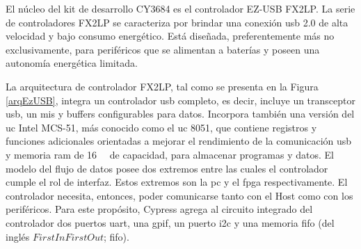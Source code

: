 El núcleo del kit de desarrollo CY3684 es el controlador EZ-USB FX2LP. La serie de controladores FX2LP se caracteriza por brindar una conexión \acrshort{usb} 2.0 de alta velocidad y bajo consumo energético. Está diseñada, preferentemente más no exclusivamente, para periféricos que se alimentan a baterías y poseen una autonomía energética limitada.

La arquitectura de controlador FX2LP, tal como se presenta en la Figura \ref{arqEzUSB}, integra un controlador \acrshort{usb} completo, es decir, incluye un transceptor \acrshort{usb}, un \acrfull{mis} y buffers configurables para datos. Incorpora también una versión del \acrfull{uc} Intel MCS-51, más conocido como el \acrshort{uc} 8051, que contiene registros y funciones adicionales orientadas a mejorar el rendimiento de la comunicación \acrshort{usb} y memoria \acrshort{ram} de \SI{16}{\kilo\byte} de capacidad, para almacenar programas y datos. 
El modelo del flujo de datos posee dos extremos entre las cuales el controlador cumple el rol de interfaz. Estos extremos son la \acrshort{pc} y el \acrshort{fpga} respectivamente. El controlador necesita, entonces, poder comunicarse tanto con el Host como con los periféricos. Para este propósito, Cypress agrega al circuito integrado del controlador dos puertos \acrshort{uart}, una \acrfull{gpif}, un puerto \acrshort{i2c} y una memoria \acrshort{fifo} (del inglés \(First In First Out\); \acrlong{fifo}).

